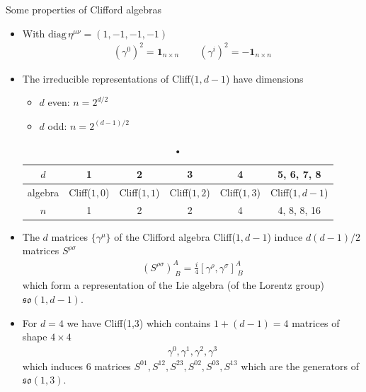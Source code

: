 \documentclass[10pt,a4paper]{book}
\theoremstyle{definition}
\begin{document}
Some properties of Clifford algebras
\begin{itemize}
\item With $\text{diag}\,\eta^{\mu\nu}=(1,-1,-1,-1)$
\begin{align}
(\gamma^0)^2=\mathbf{1}_{n\times n}\qquad(\gamma^i)^2=-\mathbf{1}_{n\times n}
\end{align}
\item The irreducible representations of Cliff($1,d-1$) have dimensions
\begin{itemize}
\item $d$ even: $n=2^{d/2}$
\item $d$ odd: $n=2^{(d-1)/2}$
\end{itemize}

\begin{center}
\begin{table}[h]
\centering
\begin{tabular}{|c|c|c|c|c|c|}
\hline
$d$ & 1            & 2            & 3            & 4            & 5, 6, 7, 8\\ \hline\hline
algebra    & Cliff($1,0$) & Cliff($1,1$) & Cliff($1,2$) &   Cliff($1,3$) & Cliff($1,d-1$)\\ \hline
$n$ & 1            & 2            & 2            & 4            & 
4, 8, 8, 16\\ \hline
\end{tabular}
\caption{•}
\end{table}
\end{center}

\item The $d$ matrices $\{\gamma^\mu\}$ of the Clifford algebra Cliff($1,d-1$) induce $d(d-1)/2$ matrices $S^{\rho\sigma}$  
\begin{align}
(S^{\rho\sigma})^A_{\;B}=\frac{i}{4}[\gamma^\rho,\gamma^\sigma]^A_{\;B}
\end{align}
which form a representation of the Lie algebra (of the Lorentz group) $\mathfrak{so}(1,d-1)$.

\item For $d=4$ we have Cliff(1,3) which contains $1+(d-1)=4$ matrices of shape $4\times4$
\begin{align}
\gamma^0, \gamma^1, \gamma^2, \gamma^3
\end{align}
which induces 6 matrices $S^{01}, S^{12}, S^{23}, S^{02}, S^{03}, S^{13}$ which are the generators of $\mathfrak{so}(1,3)$.


\end{itemize}
\end{document}
